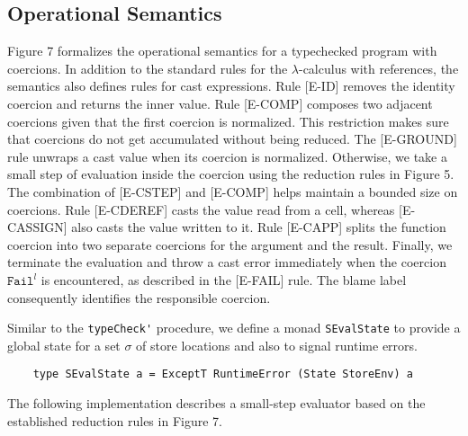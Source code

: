 \subsection{Operational Semantics}
Figure 7 formalizes the operational semantics for a typechecked 
program with coercions. In addition to the standard rules for 
the $\lambda$-calculus with references, the semantics also 
defines rules for cast expressions. Rule  
{\scriptsize{[E-ID]}} removes the identity coercion and 
returns the inner value. 
Rule {\scriptsize{[E-COMP]}} composes two 
adjacent coercions given that the first coercion is normalized. 
This restriction makes sure that coercions do not get accumulated 
without being reduced. 
The {\scriptsize{[E-GROUND]}} rule unwraps a cast value 
when its coercion is normalized. Otherwise, we take a small 
step of evaluation inside the coercion using the reduction rules 
in Figure 5. The combination of {\scriptsize{[E-CSTEP]}} and 
{\scriptsize{[E-COMP]}} helps maintain a bounded size on coercions. 
Rule {\scriptsize{[E-CDEREF]}} casts the value read 
from a cell, whereas {\scriptsize{[E-CASSIGN]}} also casts the value 
written to it. Rule 
{\scriptsize{[E-CAPP]}} splits the function coercion 
into two separate coercions for the argument and the result. 
Finally, we terminate the evaluation and throw a cast error 
immediately when the coercion $\texttt{Fail}^l$ is encountered, 
as described in the {\scriptsize{[E-FAIL]}} rule. The blame 
label consequently identifies the responsible coercion.

Similar to the \lstinline{typeCheck'} procedure, we define a 
monad \lstinline{SEvalState} to provide a global state for a set $\sigma$ of 
store locations and also to signal runtime errors.
\begin{lstlisting}
    type SEvalState a = ExceptT RuntimeError (State StoreEnv) a
\end{lstlisting}
The following implementation describes a small-step evaluator 
based on the established reduction rules in Figure 7.



